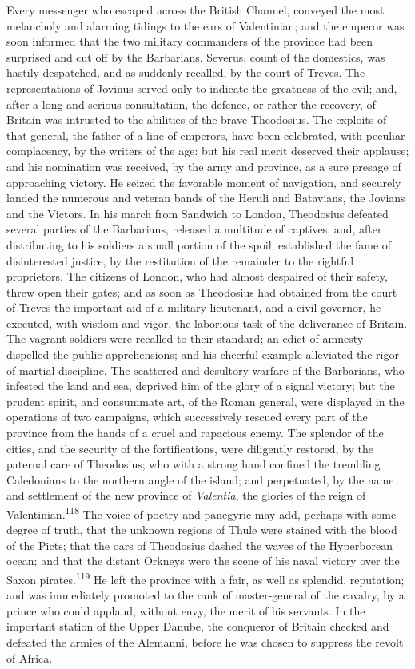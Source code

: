 Every messenger who escaped across the British Channel, conveyed
the most melancholy and alarming tidings to the ears of
Valentinian; and the emperor was soon informed that the two
military commanders of the province had been surprised and cut
off by the Barbarians. Severus, count of the domestics, was
hastily despatched, and as suddenly recalled, by the court of
Treves. The representations of Jovinus served only to indicate
the greatness of the evil; and, after a long and serious
consultation, the defence, or rather the recovery, of Britain was
intrusted to the abilities of the brave Theodosius. The exploits
of that general, the father of a line of emperors, have been
celebrated, with peculiar complacency, by the writers of the age:
but his real merit deserved their applause; and his nomination
was received, by the army and province, as a sure presage of
approaching victory. He seized the favorable moment of
navigation, and securely landed the numerous and veteran bands of
the Heruli and Batavians, the Jovians and the Victors. In his
march from Sandwich to London, Theodosius defeated several
parties of the Barbarians, released a multitude of captives, and,
after distributing to his soldiers a small portion of the spoil,
established the fame of disinterested justice, by the restitution
of the remainder to the rightful proprietors. The citizens of
London, who had almost despaired of their safety, threw open
their gates; and as soon as Theodosius had obtained from the
court of Treves the important aid of a military lieutenant, and a
civil governor, he executed, with wisdom and vigor, the laborious
task of the deliverance of Britain. The vagrant soldiers were
recalled to their standard; an edict of amnesty dispelled the
public apprehensions; and his cheerful example alleviated the
rigor of martial discipline. The scattered and desultory warfare
of the Barbarians, who infested the land and sea, deprived him of
the glory of a signal victory; but the prudent spirit, and
consummate art, of the Roman general, were displayed in the
operations of two campaigns, which successively rescued every
part of the province from the hands of a cruel and rapacious
enemy. The splendor of the cities, and the security of the
fortifications, were diligently restored, by the paternal care of
Theodosius; who with a strong hand confined the trembling
Caledonians to the northern angle of the island; and perpetuated,
by the name and settlement of the new province of \textit{Valentia}, the
glories of the reign of Valentinian.\textsuperscript{118} The voice of poetry and
panegyric may add, perhaps with some degree of truth, that the
unknown regions of Thule were stained with the blood of the
Picts; that the oars of Theodosius dashed the waves of the
Hyperborean ocean; and that the distant Orkneys were the scene of
his naval victory over the Saxon pirates.\textsuperscript{119} He left the
province with a fair, as well as splendid, reputation; and was
immediately promoted to the rank of master-general of the
cavalry, by a prince who could applaud, without envy, the merit
of his servants. In the important station of the Upper Danube,
the conqueror of Britain checked and defeated the armies of the
Alemanni, before he was chosen to suppress the revolt of Africa.

